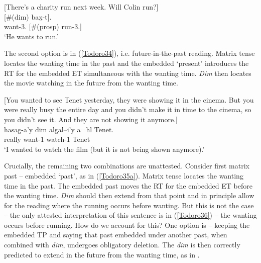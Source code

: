 \documentclass[output=paper]{langscibook}
\begin{document}
\begin{exe}
\ex \label{Todoro33}
\begin{xlist}

\ex \label{Todoro33a} [There’s a charity run next week. Will Colin run?]\\
	[\#({dim})	{bax̱-t}].	 \\
    want-3.{\seriesII}	[\#({prosp})	run-3.{\seriesII}]	\\
\glt ‘He wants to run.’ 

\ex \label{Todoro33b}

\end{xlist}
\end{exe}

The second option is in (\ref{Todoro34}), i.e. future-in-the-past reading. Matrix tense locates the wanting time in the past and the embedded ‘present’ introduces the RT for the embedded ET simultaneous with the wanting time. \emph{Dim} then locates the movie watching in the future from the wanting time.

\begin{exe}
\ex \label{Todoro34}
\begin{xlist}

\ex \label{Todoro34a} [You wanted to see Tenet yesterday, they were showing it in the cinema. But you were really busy the entire day and you didn’t make it in time to the cinema, so you didn’t see it. And they are not showing it anymore.]\\
 {hasag-a’y}	{dim}	{algal--i’y}		{a=hl}		{Tenet}.	 \\
    really 	want-1{\sg}		watch-1	  	Tenet	\\
\glt ‘I wanted to watch the film (but it is not being shown anymore).’ 

\ex \label{Todoro34b}

\end{xlist}
\end{exe}

Crucially, the remaining two combinations are unattested. Consider first matrix past -- embedded ‘past’, as in (\ref{Todoro35a}). Matrix tense locates the wanting time in the past. The embedded past moves the RT for the embedded ET before the wanting time. \emph{Dim} should then extend from that point and in principle allow for the reading where the running occurs before wanting. But this is not the case -- the only attested interpretation of this sentence is in (\ref{Todoro36}) -- the wanting occurs before running. How do we account for this? One option is -- keeping the embedded TP and saying that past embedded under another past, when combined with \emph{dim}, undergoes obligatory deletion. The \emph{dim} is then correctly predicted to extend in the future from the wanting time, as in .
\end{document}

